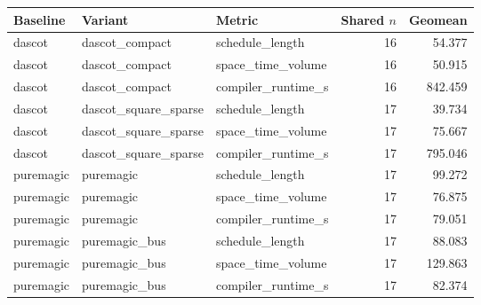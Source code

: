 \begin{tabular}{lllrr}
\hline
Baseline & Variant & Metric & Shared $n$ & Geomean \\
\hline
dascot & dascot\_compact & schedule\_length & 16 & 54.377 \\
dascot & dascot\_compact & space\_time\_volume & 16 & 50.915 \\
dascot & dascot\_compact & compiler\_runtime\_s & 16 & 842.459 \\
dascot & dascot\_square\_sparse & schedule\_length & 17 & 39.734 \\
dascot & dascot\_square\_sparse & space\_time\_volume & 17 & 75.667 \\
dascot & dascot\_square\_sparse & compiler\_runtime\_s & 17 & 795.046 \\
puremagic & puremagic & schedule\_length & 17 & 99.272 \\
puremagic & puremagic & space\_time\_volume & 17 & 76.875 \\
puremagic & puremagic & compiler\_runtime\_s & 17 & 79.051 \\
puremagic & puremagic\_bus & schedule\_length & 17 & 88.083 \\
puremagic & puremagic\_bus & space\_time\_volume & 17 & 129.863 \\
puremagic & puremagic\_bus & compiler\_runtime\_s & 17 & 82.374 \\
\hline
\end{tabular}
